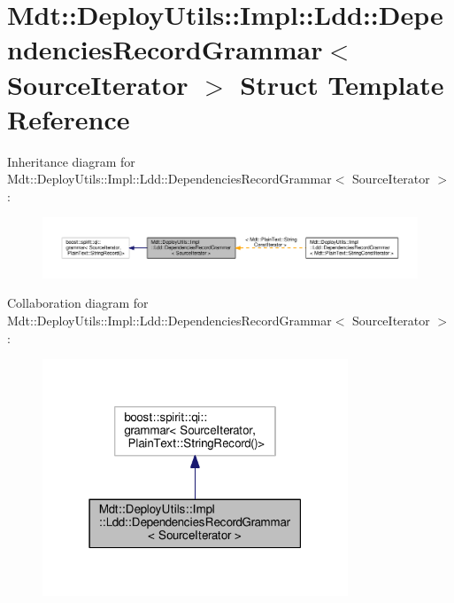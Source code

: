 \hypertarget{struct_mdt_1_1_deploy_utils_1_1_impl_1_1_ldd_1_1_dependencies_record_grammar}{}\section{Mdt\+:\+:Deploy\+Utils\+:\+:Impl\+:\+:Ldd\+:\+:Dependencies\+Record\+Grammar$<$ Source\+Iterator $>$ Struct Template Reference}
\label{struct_mdt_1_1_deploy_utils_1_1_impl_1_1_ldd_1_1_dependencies_record_grammar}


Inheritance diagram for Mdt\+:\+:Deploy\+Utils\+:\+:Impl\+:\+:Ldd\+:\+:Dependencies\+Record\+Grammar$<$ Source\+Iterator $>$\+:
\nopagebreak
\begin{figure}[H]
\begin{center}
\leavevmode
\includegraphics[width=350pt]{struct_mdt_1_1_deploy_utils_1_1_impl_1_1_ldd_1_1_dependencies_record_grammar__inherit__graph}
\end{center}
\end{figure}


Collaboration diagram for Mdt\+:\+:Deploy\+Utils\+:\+:Impl\+:\+:Ldd\+:\+:Dependencies\+Record\+Grammar$<$ Source\+Iterator $>$\+:
\nopagebreak
\begin{figure}[H]
\begin{center}
\leavevmode
\includegraphics[width=259pt]{struct_mdt_1_1_deploy_utils_1_1_impl_1_1_ldd_1_1_dependencies_record_grammar__coll__graph}
\end{center}
\end{figure}


